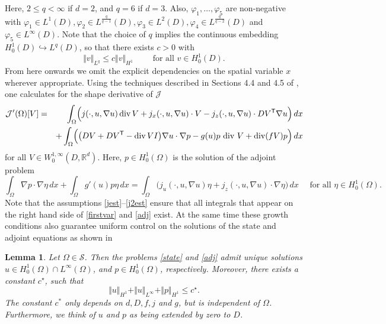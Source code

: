 \documentclass[a4paper,10pt]{article}
\newcommand{\dx}{\,dx}
\theoremstyle{plain}
\newtheorem{lemma}[thm]{Lemma}
\theoremstyle{plain}
\numberwithin{equation}{section}
\DeclareMathOperator{\Div}{div}
\begin{document}
Here, $2 \leq q < \infty$ if $d=2$, and $q= 6$ if $d =3$. Also, $\varphi_1,\ldots,\varphi_5$ are non-negative with 
$\varphi_1 \in L^1(D), \varphi_2 \in L^{\frac{q}{q-1}}(D), \varphi_3 \in L^2(D), \varphi_4 \in L^{\frac{q}{q-2}}(D)$ and 
$\varphi_5 \in L^\infty(D)$.
{Note that the choice of $q$ implies the continuous embedding $H^1_0(D) \hookrightarrow L^q(D)$, so that there exists $c>0$ with
\begin{equation} \label{Dembed}
\Vert v \Vert_{L^q} \leq c \Vert v \Vert_{H^1} \qquad \mbox{ for all } v \in H^1_0(D).
\end{equation} } 
\noindent
From here onwards we omit the explicit dependencies on the spatial variable $x$ wherever appropriate. 
Using the techniques described in Sections 4.4 and 4.5 of \cite{ADJ21}, one calculates for the shape  derivative of $\mathcal J$
\begin{eqnarray}
 \mathcal J'(\Omega)[V] 
 & = &  \int_{\Omega} \Bigl( j(\cdot,u,\nabla u) \Div V + j_x(\cdot,u,\nabla u)\cdot  V  - j_z(\cdot,u,\nabla u) \cdot DV^{\mathsf{T}} \nabla u \Bigr)  \dx    \label{firstvar} \\
 & & + \int_{\Omega} \Bigl(  \bigl( DV + D V^{\mathsf{T}} - \Div V I \bigr)  \nabla u \cdot \nabla p - g(u)p \mbox{ div }V + {\Div}( f V) p   \Bigr)  \dx \nonumber
\end{eqnarray}
for all $V \in W^{1,\infty}_0(D, \mathbb R^d)$. Here,
$p \in H^1_0(\Omega)$ is the solution of the adjoint problem
\begin{equation} \label{adj}
\int_{\Omega} \nabla p \cdot \nabla \eta  \dx + \int_{\Omega} g'(u) p \eta \dx = \int_{\Omega} \bigl( j_u(\cdot,u,\nabla u) \eta + j_z(\cdot,u,\nabla u) \cdot \nabla \eta \bigr)  \dx \quad \mbox{ for all } \eta \in H^1_0(\Omega).
\end{equation}
Note that the assumptions \eqref{jest}--\eqref{j2est} ensure that
all integrals that appear on the right hand side of \eqref{firstvar} and \eqref{adj} exist. At the same time these growth conditions
also guarantee uniform control on the solutions of the state
and adjoint equations as shown in 
\begin{lemma} \label{lem:apriori} Let $\Omega \in \mathcal S$. Then the problems \eqref{state} and \eqref{adj} admit unique solutions $u\in H^1_0(\Omega)\cap L^\infty(\Omega)$, and $p \in H^1_0(\Omega)$, respectively. Moreover, there exists a constant $c^\star$, such that
\begin{equation} \label{discapriori}
\Vert u \Vert_{H^1} + \Vert u\Vert_{L^\infty} + \Vert p \Vert_{H^1} \leq c^\star.
\end{equation}
The constant $c^*$ only depends on $d,D, f,j$ and $g$, but
is independent of $\Omega$. Furthermore, we think of $u$ and $p$ as being extended by zero to $D$.
\end{lemma}
\end{document}
